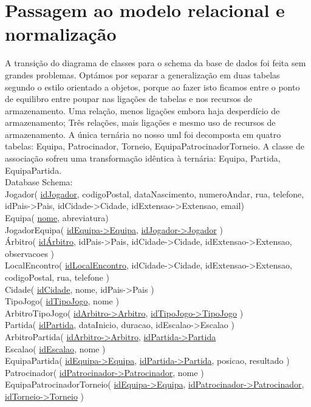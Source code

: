 \documentclass[a4paper]{article}
\begin{document}
\section{Passagem ao modelo relacional e normalização}
A transição do diagrama de classes para o schema da base de dados foi feita sem grandes problemas. Optámos por separar a generalização em duas tabelas segundo o estilo orientado a objetos, porque ao fazer isto ficamos entre o ponto de equilibro entre poupar nas ligações de tabelas e nos recursos de armazenamento. Uma relação, menos ligações embora haja desperdício de armazenamento; Três relações, mais ligações e mesmo uso de recursos de armazenamento. A única ternária no nosso uml foi decomposta em quatro tabelas: Equipa, Patrocinador, Torneio, EquipaPatrocinadorTorneio. A classe de associação sofreu uma transformação idêntica à ternária: Equipa, Partida, EquipaPartida.
\\\newline
Database Schema:\\
Jogador( \underline{idJogador}, codigoPostal, dataNascimento, numeroAndar, rua, telefone, idPais->Pais, idCidade->Cidade, idExtensao->Extensao, email) \\
Equipa( \underline{nome}, abreviatura) \\ %
JogadorEquipa( \underline{idEquipa->Equipa}, \underline{idJogador->Jogador} ) \\
Árbitro( \underline{idÁrbitro}, idPais->Pais, idCidade->Cidade, idExtensao->Extensao, observacoes ) \\
LocalEncontro( \underline{idLocalEncontro}, idCidade->Cidade, idExtensao->Extensao, codigoPostal, rua, telefone ) \\
Cidade( \underline{idCidade}, nome, idPais->Pais ) \\
TipoJogo( \underline{idTipoJogo}, nome ) \\
ArbitroTipoJogo( \underline{idArbitro->Arbitro}, \underline{idTipoJogo->TipoJogo} ) \\
Partida( \underline{idPartida}, dataInicio, duracao, idEscalao->Escalao ) \\
ArbitroPartida( \underline{idArbitro->Arbitro}, \underline{idPartida->Partida} \\
Escalao( \underline{idEscalao}, nome ) \\
EquipaPartida( \underline{idEquipa->Equipa}, \underline{idPartida->Partida}, posicao, resultado ) \\
Patrocinador( \underline{idPatrocinador->Patrocinador}, nome ) \\
EquipaPatrocinadorTorneio( \underline{idEquipa->Equipa}, \underline{idPatrocinador->Patrocinador}, \underline{idTorneio->Torneio} ) \\
\end{document}
